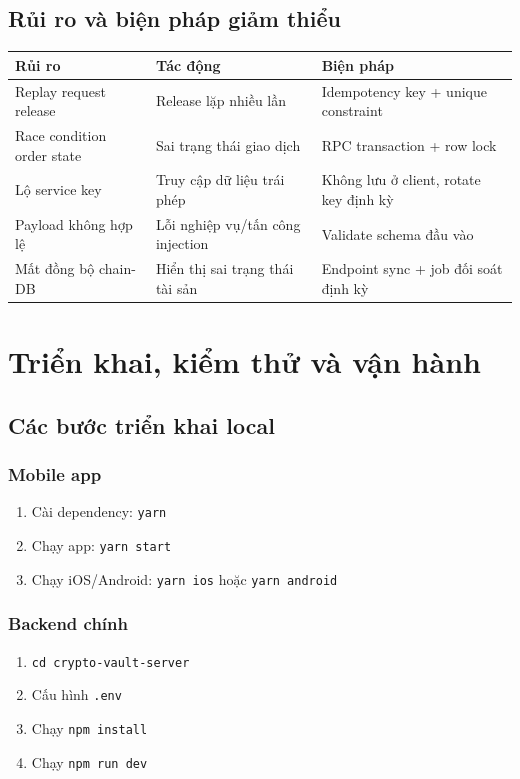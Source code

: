 \documentclass[a4paper,12pt]{report}
\begin{document}
\section{Rủi ro và biện pháp giảm thiểu}
\begin{longtable}{|p{4.2cm}|p{4.7cm}|p{4.7cm}|}
\hline
\textbf{Rủi ro} & \textbf{Tác động} & \textbf{Biện pháp} \\
\hline
Replay request release & Release lặp nhiều lần & Idempotency key + unique constraint \\
\hline
Race condition order state & Sai trạng thái giao dịch & RPC transaction + row lock \\
\hline
Lộ service key & Truy cập dữ liệu trái phép & Không lưu ở client, rotate key định kỳ \\
\hline
Payload không hợp lệ & Lỗi nghiệp vụ/tấn công injection & Validate schema đầu vào \\
\hline
Mất đồng bộ chain-DB & Hiển thị sai trạng thái tài sản & Endpoint sync + job đối soát định kỳ \\
\hline
\end{longtable}

\chapter{Triển khai, kiểm thử và vận hành}

\section{Các bước triển khai local}
\subsection{Mobile app}
\begin{enumerate}
    \item Cài dependency: \texttt{yarn}
    \item Chạy app: \texttt{yarn start}
    \item Chạy iOS/Android: \texttt{yarn ios} hoặc \texttt{yarn android}
\end{enumerate}

\subsection{Backend chính}
\begin{enumerate}
    \item \texttt{cd crypto-vault-server}
    \item Cấu hình \texttt{.env}
    \item Chạy \texttt{npm install}
    \item Chạy \texttt{npm run dev}
\end{enumerate}
\end{document}
